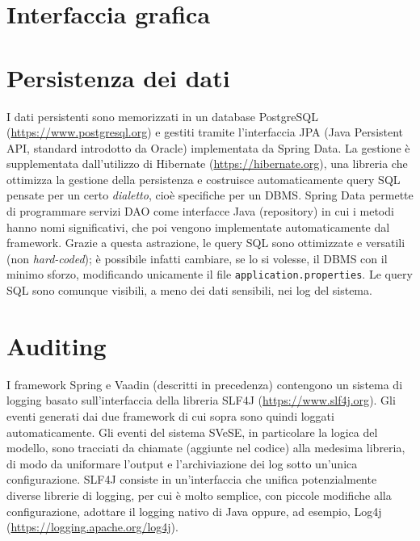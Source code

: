 \section{Interfaccia grafica}\label{gui}




\section{Persistenza dei dati}\label{db}
I dati persistenti sono memorizzati in un database PostgreSQL (\url{https://www.postgresql.org}) e gestiti tramite l'interfaccia JPA (Java Persistent API, standard introdotto da Oracle) implementata da Spring Data. La gestione è supplementata dall'utilizzo di Hibernate (\url{https://hibernate.org}), una libreria che ottimizza la gestione della persistenza e costruisce automaticamente query SQL pensate per un certo \emph{dialetto}, cioè specifiche per un DBMS. Spring Data permette di programmare servizi DAO come interfacce Java (repository) in cui i metodi hanno nomi significativi, che poi vengono implementate automaticamente dal framework. Grazie a questa astrazione, le query SQL sono ottimizzate e versatili (non \emph{hard-coded}); è possibile infatti cambiare, se lo si volesse, il DBMS con il minimo sforzo, modificando unicamente il file \verb!application.properties!. Le query SQL sono comunque visibili, a meno dei dati sensibili, nei log del sistema.




\section{Auditing}\label{logging}
I framework Spring e Vaadin (descritti in precedenza) contengono un sistema di logging basato sull'interfaccia della libreria SLF4J (\url{https://www.slf4j.org}). Gli eventi generati dai due framework di cui sopra sono quindi loggati automaticamente. Gli eventi del sistema SVeSE, in particolare la logica del modello, sono tracciati da chiamate (aggiunte nel codice) alla medesima libreria, di modo da uniformare l'output e l'archiviazione dei log sotto un'unica configurazione. SLF4J consiste in un'interfaccia che unifica potenzialmente diverse librerie di logging, per cui è molto semplice, con piccole modifiche alla configurazione, adottare il logging nativo di Java oppure, ad esempio, Log4j (\url{https://logging.apache.org/log4j}).




